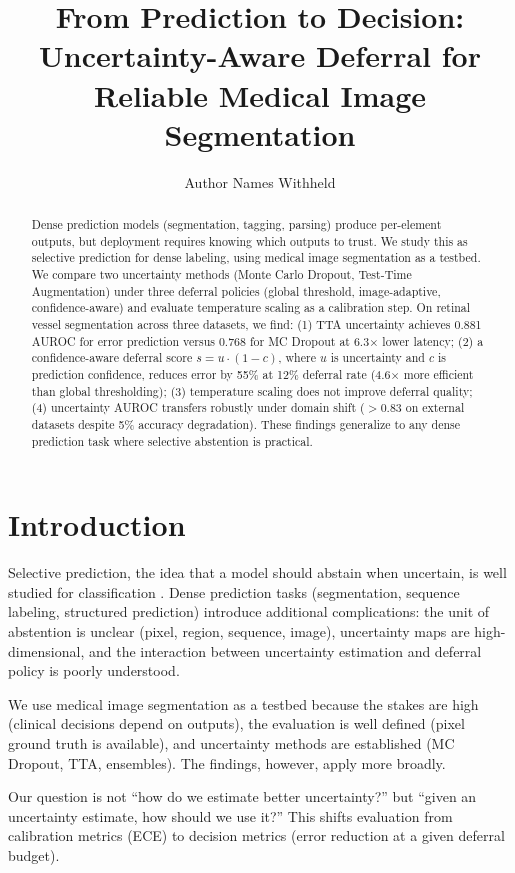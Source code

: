 \documentclass[11pt]{article}
\title{From Prediction to Decision: Uncertainty-Aware Deferral for Reliable Medical Image Segmentation}
\author{Author Names Withheld}
\begin{document}
\maketitle

\begin{abstract}
Dense prediction models (segmentation, tagging, parsing) produce per-element
outputs, but deployment requires knowing which outputs to trust. We study this
as selective prediction for dense labeling, using medical image segmentation as
a testbed. We compare two uncertainty methods (Monte Carlo Dropout, Test-Time
Augmentation) under three deferral policies (global threshold, image-adaptive,
confidence-aware) and evaluate temperature scaling as a calibration step. On
retinal vessel segmentation across three datasets, we find: (1) TTA uncertainty
achieves 0.881 AUROC for error prediction versus 0.768 for MC Dropout at
6.3$\times$ lower latency; (2) a confidence-aware deferral score $s = u \cdot
(1 - c)$, where $u$ is uncertainty and $c$ is prediction confidence, reduces
error by 55\% at 12\% deferral rate (4.6$\times$ more efficient than global
thresholding); (3) temperature scaling does not improve deferral quality; (4)
uncertainty AUROC transfers robustly under domain shift ($>$0.83 on external
datasets despite 5\% accuracy degradation). These findings generalize to any
dense prediction task where selective abstention is practical.
\end{abstract}

\section{Introduction}

Selective prediction, the idea that a model should abstain when uncertain, is
well studied for classification \citep{geifman2017selective,
el2010foundations}. Dense prediction tasks (segmentation, sequence labeling,
structured prediction) introduce additional complications: the unit of
abstention is unclear (pixel, region, sequence, image), uncertainty maps are
high-dimensional, and the interaction between uncertainty estimation and
deferral policy is poorly understood.

We use medical image segmentation as a testbed because the stakes are high
(clinical decisions depend on outputs), the evaluation is well defined (pixel
ground truth is available), and uncertainty methods are established (MC Dropout,
TTA, ensembles). The findings, however, apply more broadly.

Our question is not ``how do we estimate better uncertainty?'' but
``given an uncertainty estimate, how should we use it?'' This shifts
evaluation from calibration metrics (ECE) to decision metrics (error reduction
at a given deferral budget).
\end{document}
